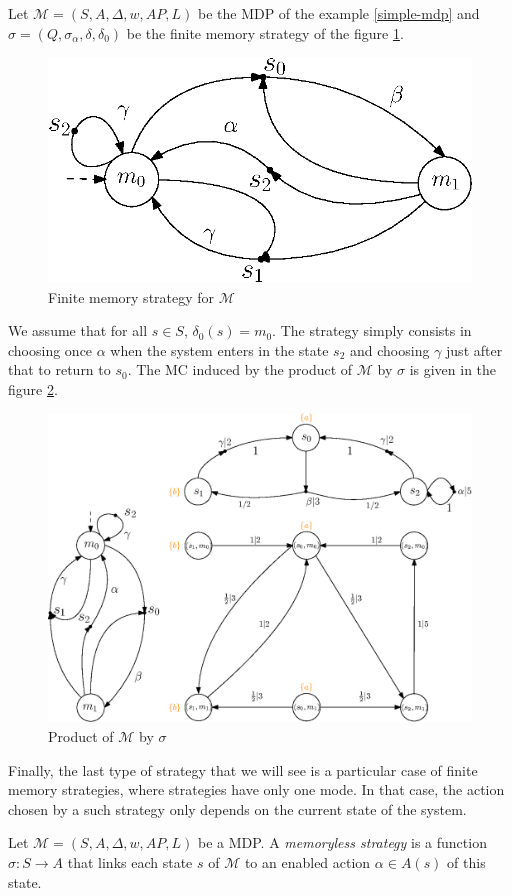 \begin{example}
  Let $\mathcal{M}=(S, A, \Delta, w, AP, L)$ be the MDP of the example \ref{simple-mdp} and $\sigma = (Q, \sigma_\alpha, \delta, \delta_0)$ be the
  finite memory strategy of the figure \ref{finite_mem_strat}.
  \begin{figure}[h!]
    \centering
    \includegraphics[width=0.4\linewidth]{resources/strategy}
    \caption{Finite memory strategy for $\mathcal{M}$}\label{finite_mem_strat}
  \end{figure}

  We assume that for all $s \in S$, $\delta_0(s) = m_0$. The strategy simply consists in choosing once $\alpha$ when the system enters in the state $s_2$ and choosing $\gamma$ just after that to return to $s_0$. The MC induced by the product of $\mathcal{M}$ by $\sigma$ is given in the figure
  \ref{inducedMC}.
  \begin{figure}[h!]
    \centering
    \includegraphics[width=0.55\linewidth]{resources/inductedmarkov}
    \caption{Product of $\mathcal{M}$ by $\sigma$}\label{inducedMC}
  \end{figure}
\end{example}

Finally, the last type of strategy that we will see is a particular case of finite memory strategies, where strategies have only one mode.
In that case, the action chosen by a such strategy only depends on the current state of the system.

\begin{definition}
  Let $\mathcal{M}=(S, A, \Delta, w, AP, L)$ be a MDP. A \textit{memoryless strategy} is a function
  $
    \sigma: S \rightarrow A
  $ that links each state $s$ of $\mathcal{M}$ to an enabled action $\alpha \in A(s)$ of this state.
\end{definition}

